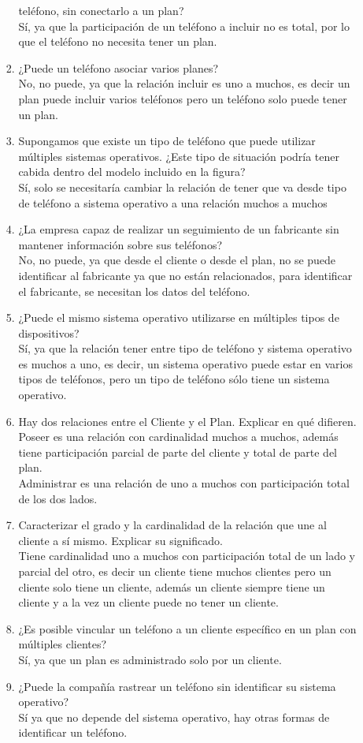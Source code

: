\documentclass[a4paper, 12pt]{report}
\begin{document}
\begin{enumerate}
\begin{enumerate}
\begin{enumerate}
			teléfono, sin conectarlo a un plan?\\
			Sí, ya que la participación de un teléfono a incluir no es
			total, por lo que el teléfono no necesita tener un plan.
			\item ¿Puede un teléfono asociar varios planes?\\
			No, no puede, ya que la relación incluir es uno a muchos, 
			es decir un plan puede incluir varios teléfonos pero un
			teléfono solo puede tener un plan.
			\item Supongamos que existe un tipo de teléfono que puede
			utilizar múltiples sistemas operativos. ¿Este tipo de 
			situación podría tener cabida dentro del modelo incluido
			en la figura?\\
			Sí, solo se necesitaría cambiar la relación de tener que va
			desde tipo de teléfono a sistema operativo a una relación
			muchos a muchos
			\item ¿La empresa capaz de realizar un seguimiento de un 
			fabricante sin mantener información sobre sus teléfonos?\\
			No, no puede, ya que desde el cliente o desde el plan, 
			no se puede identificar al fabricante ya que no están
			relacionados, para identificar el fabricante, se necesitan 
			los datos del teléfono.	
			\item ¿Puede el mismo sistema operativo utilizarse en 
			múltiples tipos de dispositivos?\\
			Sí, ya que la relación tener entre tipo de teléfono y 
			sistema operativo es muchos a uno, es decir, un sistema 
			operativo puede estar en varios tipos de teléfonos, pero
			un tipo de teléfono sólo tiene un sistema operativo.
			\item Hay dos relaciones entre el Cliente y el Plan. Explicar en qué difieren.\\
			Poseer es una relación con cardinalidad muchos a muchos, 
			además tiene participación parcial de parte del cliente y
			total de parte del plan.\\
			Administrar es una relación de uno a muchos con 
			participación total de los dos lados.
			\item Caracterizar el grado y la cardinalidad de la 
			relación que une al cliente a sí mismo. Explicar su 
			significado.\\
			Tiene cardinalidad uno a muchos con participación total de
			un lado y parcial del otro, es decir un cliente tiene muchos clientes pero un cliente solo tiene un cliente,
			además un cliente siempre tiene un cliente y a la vez un 
			cliente puede no tener un cliente. 
			\item ¿Es posible vincular un teléfono a un cliente 
			específico en un plan con múltiples clientes?\\
			Sí, ya que un plan es administrado solo por un cliente.
			\item ¿Puede la compañía rastrear un teléfono sin identificar su sistema operativo?\\
			Sí ya que no depende del sistema operativo, hay otras 
			formas de identificar un teléfono.
			

\end{enumerate}
\end{enumerate}
\end{enumerate}
\end{document}
